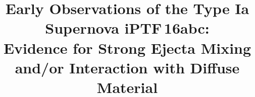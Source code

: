 \documentclass[twocolumn]{aastex61}
\newcommand{\abc}{iPTF\,16abc}
\begin{document}
\title{Early Observations of the Type Ia Supernova \abc:\\
Evidence for Strong Ejecta Mixing and/or Interaction with Diffuse Material}


\end{document}
